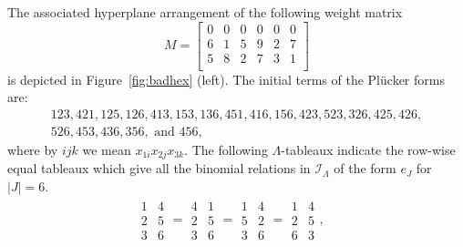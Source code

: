 \documentclass[ALCO,ThmDefs,Unicode,epreuves]{cedram}
\newcommand{\I}{\mathcal{I}}
\begin{document}
\begin{exam}\label{exam:hexagon}
The associated hyperplane arrangement of the following weight matrix 
\[
M=\begin{bmatrix}
 0 & 0 & 0 & 0 & 0 & 0 \\
 6 & 1 & 5 & 9 & 2 & 7 \\
 5 & 8 & 2 & 7 & 3 & 1 \\
\end{bmatrix}
\]
is depicted in Figure~\ref{fig:badhex} (left). The initial terms of the Pl{\"u}cker forms are:
\begin{gather*}
 123, 421, 125, 126, 413, 153, 136, 451, 416, 156, 423, 523, 326, 425, 426, 
\\
 526, 453, 436, 356, \text{ and } 456,
\end{gather*}
where by $ijk$ we mean $x_{1i}x_{2j}x_{3k}$. 
The following $\Lambda$-tableaux indicate the row-wise equal tableaux which give all the binomial relations in $\I_{\Lambda}$ of the form $e_J$ for $|J|=6$. %
\begin{gather*}
\begin{array}{c}1 \\2 \\3\end{array} 
\begin{array}{c}4 \\5 \\6\end{array} = 
\begin{array}{c}4 \\2 \\3\end{array} 
\begin{array}{c}1 \\5 \\6\end{array}=
\begin{array}{c}1 \\5 \\3\end{array} 
\begin{array}{c}4 \\2 \\6\end{array}= 
\begin{array}{c}1 \\2 \\6\end{array} 
\begin{array}{c}4 \\5 \\3\end{array},\quad 

\end{gather*}
\end{exam}
\end{document}

